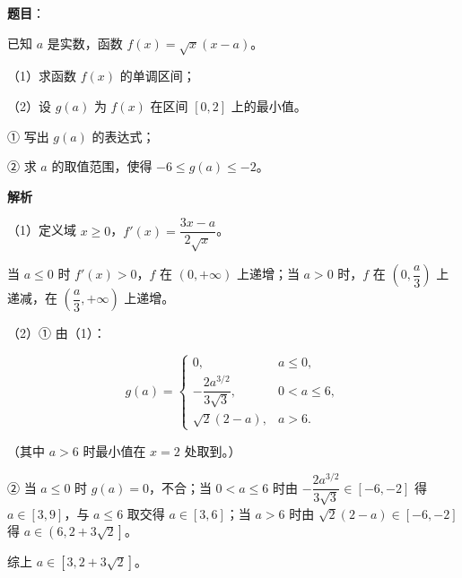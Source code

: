 \begin{answer}

\textbf{题目}：

已知 $a$ 是实数，函数 $f(x)=\sqrt x(x-a)$。

（1）求函数 $f(x)$ 的单调区间；

（2）设 $g(a)$ 为 $f(x)$ 在区间 $[0,2]$ 上的最小值。

① 写出 $g(a)$ 的表达式；

② 求 $a$ 的取值范围，使得 $-6\leqslant g(a)\leqslant-2$。

\textbf{解析}

（1）定义域 $x\geqslant0$，$f'(x)=\dfrac{3x-a}{2\sqrt x}$。

当 $a\leqslant0$ 时 $f'(x)>0$，$f$ 在 $(0,+\infty)$ 上递增；当 $a>0$ 时，$f$ 在 $\left(0,\dfrac a3\right)$ 上递减，在 $\left(\dfrac a3,+\infty\right)$ 上递增。

（2）① 由（1）：

\nopagebreak[4]
\[g(a)=\begin{cases}0,&a\leqslant0,\\[4pt]-\dfrac{2a^{3/2}}{3\sqrt3},&0<a\leqslant6,\\[8pt]\sqrt2(2-a),&a>6.\end{cases}\]

（其中 $a>6$ 时最小值在 $x=2$ 处取到。）

② 当 $a\leqslant0$ 时 $g(a)=0$，不合；当 $0<a\leqslant6$ 时由 $-\dfrac{2a^{3/2}}{3\sqrt3}\in[-6,-2]$ 得 $a\in[3,9]$，与 $a\leqslant6$ 取交得 $a\in[3,6]$；当 $a>6$ 时由 $\sqrt2(2-a)\in[-6,-2]$ 得 $a\in\left(6,2+3\sqrt2\right]$。

综上 $a\in\left[3,2+3\sqrt2\right]$。


\end{answer}
